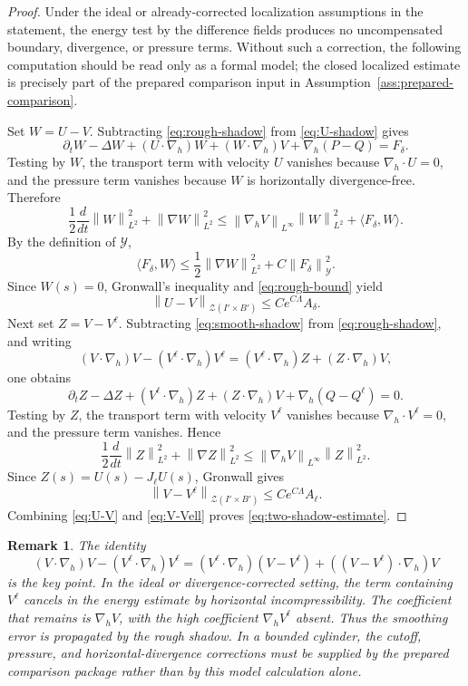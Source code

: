 \documentclass[pdflatex,sn-mathphys-num]{sn-jnl}
\numberwithin{equation}{section}
\theoremstyle{thmstyleone}
\theoremstyle{thmstylethree}
\newtheorem{remark}[theorem]{Remark}
\newcommand{\nabh}{\nabla_h}
\newcommand{\norm}[2]{\left\|#1\right\|_{#2}}
\newcommand{\calY}{\mathcal Y}
\newcommand{\calZ}{\mathcal Z}
\begin{document}
\begin{proof}
Under the ideal or already-corrected localization assumptions in the statement, the energy test by the difference fields produces no uncompensated boundary, divergence, or pressure terms.  Without such a correction, the following computation should be read only as a formal model; the closed localized estimate is precisely part of the prepared comparison input in Assumption~\ref{ass:prepared-comparison}.

Set \(W=U-V\).  Subtracting \eqref{eq:rough-shadow} from \eqref{eq:U-shadow} gives
\[
        \partial_tW-\Delta W+(U\cdot\nabh)W+(W\cdot\nabh)V+\nabh(P-Q)=F_\delta.
\]
Testing by \(W\), the transport term with velocity \(U\) vanishes because \(\nabh\cdot U=0\), and the pressure term vanishes because \(W\) is horizontally divergence-free.  Therefore
\[
        \frac12\frac{d}{dt}\norm{W}{L^2}^2+
\norm{\nabla W}{L^2}^2
        \le \norm{\nabh V}{L^\infty}\norm{W}{L^2}^2+\langle F_\delta,W\rangle.
\]
By the definition of \(\calY\),
\[
        \langle F_\delta,W\rangle
        \le \frac12\norm{\nabla W}{L^2}^2+C\norm{F_\delta}{\calY}^2.
\]
Since \(W(s)=0\), Gronwall's inequality and \eqref{eq:rough-bound} yield
\begin{equation}
        \norm{U-V}{\calZ(I'\times B')}
        \le Ce^{C\Lambda}A_\delta.
        \label{eq:U-V}
\end{equation}
Next set \(Z=V-V^\ell\).  Subtracting \eqref{eq:smooth-shadow} from \eqref{eq:rough-shadow}, and writing
\[
        (V\cdot\nabh)V-(V^\ell\cdot\nabh)V^\ell
        =(V^\ell\cdot\nabh)Z+(Z\cdot\nabh)V,
\]
one obtains
\[
        \partial_tZ-\Delta Z+(V^\ell\cdot\nabh)Z+(Z\cdot\nabh)V+\nabh(Q-Q^\ell)=0.
\]
Testing by \(Z\), the transport term with velocity \(V^\ell\) vanishes because \(\nabh\cdot V^\ell=0\), and the pressure term vanishes.  Hence
\[
        \frac12\frac{d}{dt}\norm{Z}{L^2}^2+
\norm{\nabla Z}{L^2}^2
        \le \norm{\nabh V}{L^\infty}\norm{Z}{L^2}^2.
\]
Since \(Z(s)=U(s)-J_\ell U(s)\), Gronwall gives
\begin{equation}
        \norm{V-V^\ell}{\calZ(I'\times B')}
        \le Ce^{C\Lambda}A_\ell.
        \label{eq:V-Vell}
\end{equation}
Combining \eqref{eq:U-V} and \eqref{eq:V-Vell} proves \eqref{eq:two-shadow-estimate}.
\end{proof}

\begin{remark}
The identity
\[
(V\cdot\nabh)V-(V^\ell\cdot\nabh)V^\ell
=(V^\ell\cdot\nabh)(V-V^\ell)+((V-V^\ell)\cdot\nabh)V
\]
is the key point.  In the ideal or divergence-corrected setting, the term containing \(V^\ell\) cancels in the energy estimate by horizontal incompressibility.  The coefficient that remains is \(\nabh V\), with the high coefficient \(\nabh V^\ell\) absent.  Thus the smoothing error is propagated by the rough shadow.  In a bounded cylinder, the cutoff, pressure, and horizontal-divergence corrections must be supplied by the prepared comparison package rather than by this model calculation alone.
\end{remark}
\end{document}
